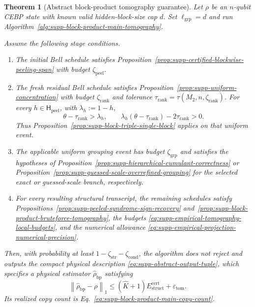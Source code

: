 \documentclass[
  aps,
  prx,
  reprint,
  superscriptaddress,
  amsmath,
  amssymb,
  nofootinbib,
  longbibliography
]{revtex4-2}
\newtheorem{theorem}{Theorem}
\begin{document}
\begin{theorem}[Abstract block-product tomography guarantee]
\label{thm:supp-abstract-block-product-tomography}
Let $\rho$ be an $n$-qubit CEBP state with known valid hidden-block-size
cap $d$.  Set $\ell_{\mathrm{grp}}=d$ and run
Algorithm~\ref{alg:supp-block-product-main-tomography}.

Assume the following stage conditions.
\begin{enumerate}
\item The initial Bell schedule satisfies
Proposition~\ref{prop:supp-certified-blockwise-peeling-span} with budget
$\zeta_{\mathrm{peel}}$.

\item The fresh residual Bell schedule satisfies
Proposition~\ref{prop:supp-uniform-concentration} with budget
$\zeta_{\mathrm{rank}}$ and tolerance
$\tau_{\mathrm{rank}}=\tau(M_2,n,\zeta_{\mathrm{rank}})$.  For every
$h\in\mathsf H_{\mathrm{peel}}$, with $\lambda_h:=1-h$,
\[
\theta-\tau_{\mathrm{rank}}>\lambda_h,
\qquad
\lambda_h(\theta-\tau_{\mathrm{rank}})
-2\tau_{\mathrm{rank}}>0.
\]
Thus Proposition~\ref{prop:supp-block-triple-single-block} applies on that
uniform event.

\item The applicable uniform grouping event has budget
$\zeta_{\mathrm{grp}}$ and satisfies the hypotheses of
Proposition~\ref{prop:supp-hierarchical-cumulant-correctness} or
Proposition~\ref{prop:supp-guessed-scale-overrefined-grouping} for the
selected exact or guessed-scale branch, respectively.

\item For every resulting structural transcript, the remaining schedules
satisfy Propositions~\ref{prop:supp-peeled-syndrome-sign-recovery}
and~\ref{prop:supp-block-product-bruteforce-tomography}, the budgets
\eqref{eq:supp-empirical-tomography-local-budgets}, and the numerical
allowance \eqref{eq:supp-empirical-projection-numerical-precision}.
\end{enumerate}

Then, with probability at least
$1-\zeta_{\mathrm{str}}-\zeta_{\mathrm{cond}}$, the algorithm does not
reject and outputs the compact physical description
\eqref{eq:supp-abstract-output-tuple}, which specifies a physical estimator
$\widehat\rho_{\mathrm{bp}}$
satisfying
\begin{equation}
\left\|\widehat\rho_{\mathrm{bp}}-\rho\right\|_1
\le
(\widehat K+1)E_{\mathrm{struct}}^{\mathrm{cert}}
+\varepsilon_{\mathrm{tom}}.
\label{eq:supp-block-product-total-tomography-error}
\end{equation}
Its realized copy count is Eq.~\eqref{eq:supp-block-product-main-copy-count}.
\end{theorem}
\end{document}
